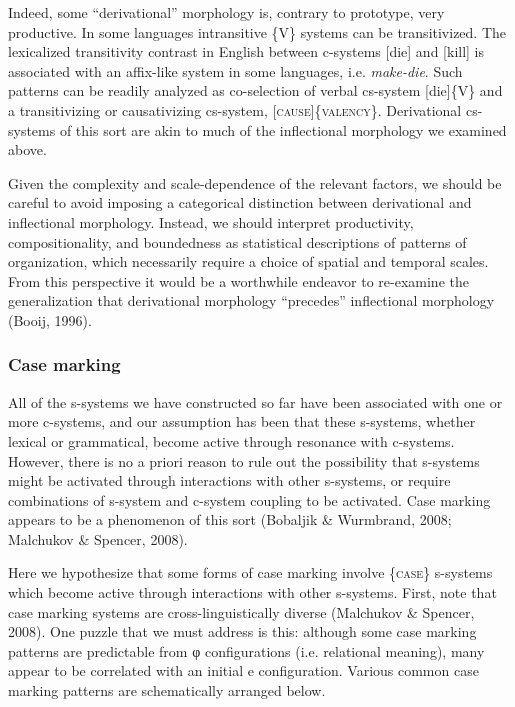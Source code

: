   Indeed, some “derivational” morphology is, contrary to prototype, very productive. In some languages intransitive \{V\} systems can be transitivized. The lexicalized transitivity contrast in English between c-systems [die] and [kill] is associated with an affix-like system in some languages, i.e. \textit{make-die}. Such patterns can be readily analyzed as co-selection of verbal cs-system [die]\{V\} and a transitivizing or causativizing cs-system, [\textsc{cause}]\{\textsc{valency}\}. Derivational cs-systems of this sort are akin to much of the inflectional morphology we examined above. 

  Given the complexity and scale-dependence of the relevant factors, we should be careful to avoid imposing a categorical distinction between derivational and inflectional morphology. Instead, we should interpret productivity, compositionality, and boundedness as statistical descriptions of patterns of organization, which necessarily require a choice of spatial and temporal scales. From this perspective it would be a worthwhile endeavor to re-examine the generalization that derivational morphology “precedes” inflectional morphology (Booij, 1996).

\subsubsection{Case marking}

All of the s-systems we have constructed so far have been associated with one or more c-systems, and our assumption has been that these s-systems, whether lexical or grammatical, become active through resonance with c-systems. However, there is no a priori reason to rule out the possibility that s-systems might be activated through interactions with other s-systems, or require combinations of s-system and c-system coupling to be activated. Case marking appears to be a phenomenon of this sort (Bobaljik \& Wurmbrand, 2008; Malchukov \& Spencer, 2008).

  Here we hypothesize that some forms of case marking involve \{\textsc{case}\} s-systems which become active through interactions with other s-systems. First, note that case marking systems are cross-linguistically diverse (Malchukov \& Spencer, 2008). One puzzle that we must address is this: although some case marking patterns are predictable from φ configurations (i.e. relational meaning), many appear to be correlated with an initial e configuration. Various common case marking patterns are schematically arranged below. 


